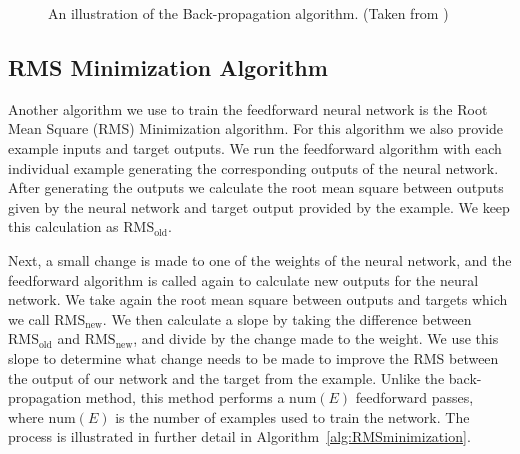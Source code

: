 \documentclass[11pt]{article}
\begin{document}
\begin{figure}[]
		\caption{An illustration of the Back-propagation algorithm. (Taken from \cite{vlsibackp_t})}
	\label{fig:figures_backpgtn}	
\end{figure}


\subsection{RMS Minimization Algorithm} %
\label{sub:rms_minimization_algorithm}

Another algorithm we use to train the feedforward neural network is the Root Mean Square (RMS) Minimization algorithm. For this
algorithm we also provide example inputs and target outputs. We run the feedforward algorithm with each individual example generating
the corresponding outputs of the neural network. After generating the outputs we calculate the root mean square between outputs given by
the neural network and target output provided by the example. We keep this calculation as $\mbox{RMS}_{\mbox{old}}$.

Next, a small change is made to one of the weights of the neural network, and the feedforward algorithm is called again to calculate new
outputs for the neural network. We take again the root mean square between outputs and targets which we call $\mbox{RMS}_{\mbox{new}}$.
We then calculate a slope by taking the difference between $\mbox{RMS}_{\mbox{old}}$ and $\mbox{RMS}_{\mbox{new}}$, and divide by the
change made to the weight. We use this slope to determine what change needs to be made to improve the RMS between the output of our
network and the target from the example. Unlike the back-propagation method, this method performs a $\mbox{num}(E)$ feedforward passes,
where $\mbox{num}(E)$ is the number of examples used to train the network. The process is illustrated in further detail in
Algorithm~\ref{alg:RMSminimization}.
\end{document}
